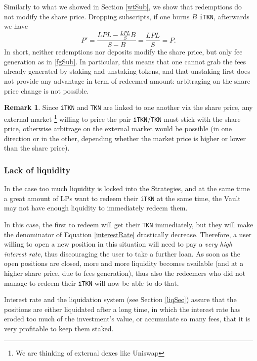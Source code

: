 \documentclass[a4paper,10 pt]{article}
\theoremstyle{definition}
\newtheorem{remark}{Remark}
\begin{document}
Similarly to what we showed in Section \ref{wtSub}, we show that redemptions do not modify the share price. Dropping subscripts, if one burns $B$ \verb|iTKN|, afterwards we have 
$$P' = \frac{LPL - \frac{LPL}{S}B}{S - B} = \frac{LPL}{S} = P.$$
In short, neither redemptions nor deposits modify the share price, but only fee generation as in \ref{fgSub}. In particular, this means that one cannot grab the fees already generated by staking and unstaking tokens, and that unstaking first does not provide any advantage in term of redeemed amount: arbitraging on the share price change is not possible.

\begin{remark}
Since \verb|iTKN| and \verb|TKN| are linked to one another via the share price, any external market \footnote{We are thinking of external dexes like Uniswap} willing to price the pair \verb|iTKN|/\verb|TKN| must stick with the share price, otherwise arbitrage on the external market would be possible (in one direction or in the other, depending whether the market price is higher or lower than the share price).
\end{remark}

\subsubsection{Lack of liquidity}\label{lackSubSub}
In the case too much liquidity is locked into the Strategies, and at the same time a great amount of LPs want to redeem their \verb|iTKN| at the same time, the Vault may not have enough liquidity to immediately redeem them.

In this case, the first to redeem will get their \verb|TKN| immediately, but they will make the denominator of Equation \eqref{interestRate} drastically decrease. Therefore, a user willing to open a new position in this situation will need to pay a {\it very high interest rate}, thus discouraging the user to take a further loan. As soon as the open positions are closed, more and more liquidity becomes available (and at a higher share price, due to fees generation), thus also the redeemers who did not manage to redeem their \verb|iTKN| will now be able to do that.

Interest rate and the liquidation system (see Section \ref{liqSec}) assure that the positions are either liquidated after a long time, in which the interest rate has eroded too much of the investment's value, or accumulate so many fees, that it is very profitable to keep them staked.
\end{document}

